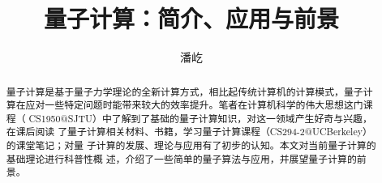 \documentclass[a4paper, 12pt]{ctexart}
\begin{document}
\title{量子计算：简介、应用与前景}
\author{潘屹}
\date{}

\maketitle

\begin{abstract}
    量子计算是基于量子力学理论的全新计算方式，相比起传统计算机的计算模式，量子计
    算在应对一些特定问题时能带来较大的效率提升。笔者在计算机科学的伟大思想这门课程（
    CS1950@SJTU）中了解到了基础的量子计算知识，对这一领域产生好奇与兴趣，在课后阅读
    了量子计算相关材料、书籍，学习量子计算课程（CS294-2@UCBerkeley）的课堂笔记；对量
    子计算的发展、理论与应用有了初步的认知。本文对当前量子计算的基础理论进行科普性概
    述，介绍了一些简单的量子算法与应用，并展望量子计算的前景。
\end{abstract}

\tableofcontents







\end{document}

